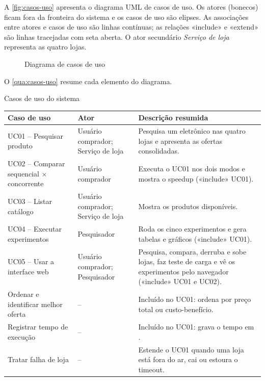 A \autoref{fig:casos-uso} apresenta o diagrama UML de casos de uso. Os atores (bonecos) ficam fora da fronteira do sistema e os casos de uso são elipses. As associações entre atores e casos de uso são linhas contínuas; as relações «include» e «extend» são linhas tracejadas com seta aberta. O ator secundário \textit{Serviço de loja} representa as quatro lojas.

\begin{figure}[htb]
  \centering
  \caption{Diagrama de casos de uso}\label{fig:casos-uso}
  \fonteautores
\end{figure}

O \autoref{qua:casos-uso} resume cada elemento do diagrama.

\begin{quadro}[!htbp]
  \centering\small
  \caption{Casos de uso do sistema}\label{qua:casos-uso}
  \begin{tabularx}{\textwidth}{|L{4.0cm}|L{3.4cm}|Y|}
    \hline
    \textbf{Caso de uso} & \textbf{Ator} & \textbf{Descrição resumida} \\ \hline
    UC01 -- Pesquisar produto & Usuário comprador; Serviço de loja & Pesquisa um eletrônico nas quatro lojas e apresenta as ofertas consolidadas. \\ \hline
    UC02 -- Comparar sequencial × concorrente & Usuário comprador & Executa o UC01 nos dois modos e mostra o speedup («include» UC01). \\ \hline
    UC03 -- Listar catálogo & Usuário comprador; Serviço de loja & Mostra os produtos disponíveis. \\ \hline
    UC04 -- Executar experimentos & Pesquisador & Roda os cinco experimentos e gera tabelas e gráficos («include» UC01). \\ \hline
    UC05 -- Usar a interface web & Usuário comprador; Pesquisador & Pesquisa, compara, derruba e sobe lojas, faz teste de carga e vê os experimentos pelo navegador («include» UC01 e UC02). \\ \hline
    Ordenar e identificar melhor oferta & -- & Incluído no UC01: ordena por preço total ou custo-benefício. \\ \hline
    Registrar tempo de execução & -- & Incluído no UC01: grava o tempo em . \\ \hline
    Tratar falha de loja & -- & Estende o UC01 quando uma loja está fora do ar, cai ou estoura o timeout. \\ \hline
  \end{tabularx}
  \fonteautores
\end{quadro}

